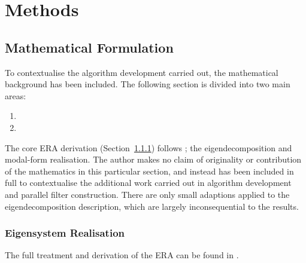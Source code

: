 \section{Methods}
\label{methods}

\subsection{Mathematical Formulation}
To contextualise the algorithm development carried out, the mathematical background has been included. The following section is divided into two main areas:

\begin{enumerate}
    \item {}
    \item {}
\end{enumerate}

The core ERA derivation (Section~\ref{sec:era-proof}) follows \cite{dafx2026}; the eigendecomposition and modal-form realisation. The author makes no claim of originality or contribution of the mathematics in this particular section, and instead has been included in full to contextualise the additional work carried out in algorithm development and parallel filter construction. There are only small adaptions applied to the eigendecomposition description, which are largely inconsequential to the results.

\subsubsection{Eigensystem Realisation}
\label{sec:era-proof}

The full treatment and derivation of the ERA can be found in \cite{juang-1994-book}.

